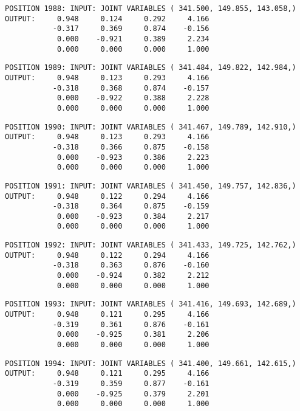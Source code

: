 \begin{verbatim}
POSITION 1988: INPUT: JOINT VARIABLES ( 341.500, 149.855, 143.058,)
OUTPUT:     0.948     0.124     0.292     4.166
           -0.317     0.369     0.874    -0.156
            0.000    -0.921     0.389     2.234
            0.000     0.000     0.000     1.000
\end{verbatim} \pagebreak[1]\begin{verbatim}
POSITION 1989: INPUT: JOINT VARIABLES ( 341.484, 149.822, 142.984,)
OUTPUT:     0.948     0.123     0.293     4.166
           -0.318     0.368     0.874    -0.157
            0.000    -0.922     0.388     2.228
            0.000     0.000     0.000     1.000
\end{verbatim} \pagebreak[1]\begin{verbatim}
POSITION 1990: INPUT: JOINT VARIABLES ( 341.467, 149.789, 142.910,)
OUTPUT:     0.948     0.123     0.293     4.166
           -0.318     0.366     0.875    -0.158
            0.000    -0.923     0.386     2.223
            0.000     0.000     0.000     1.000
\end{verbatim} \pagebreak[1]\begin{verbatim}
POSITION 1991: INPUT: JOINT VARIABLES ( 341.450, 149.757, 142.836,)
OUTPUT:     0.948     0.122     0.294     4.166
           -0.318     0.364     0.875    -0.159
            0.000    -0.923     0.384     2.217
            0.000     0.000     0.000     1.000
\end{verbatim} \pagebreak[1]\begin{verbatim}
POSITION 1992: INPUT: JOINT VARIABLES ( 341.433, 149.725, 142.762,)
OUTPUT:     0.948     0.122     0.294     4.166
           -0.318     0.363     0.876    -0.160
            0.000    -0.924     0.382     2.212
            0.000     0.000     0.000     1.000
\end{verbatim} \pagebreak[1]\begin{verbatim}
POSITION 1993: INPUT: JOINT VARIABLES ( 341.416, 149.693, 142.689,)
OUTPUT:     0.948     0.121     0.295     4.166
           -0.319     0.361     0.876    -0.161
            0.000    -0.925     0.381     2.206
            0.000     0.000     0.000     1.000
\end{verbatim} \pagebreak[1]\begin{verbatim}
POSITION 1994: INPUT: JOINT VARIABLES ( 341.400, 149.661, 142.615,)
OUTPUT:     0.948     0.121     0.295     4.166
           -0.319     0.359     0.877    -0.161
            0.000    -0.925     0.379     2.201
            0.000     0.000     0.000     1.000
\end{verbatim} \pagebreak[1]\begin{verbatim}

\end{verbatim}

